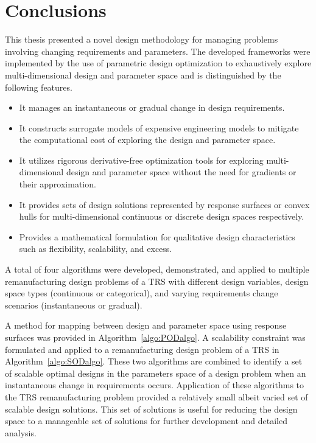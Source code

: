 \chapter{Conclusions}
\label{ch:conclusion}

This thesis presented a novel design methodology for managing problems involving changing requirements and parameters. The developed frameworks were implemented by the use of parametric design optimization to exhaustively explore multi-dimensional design and parameter space and is distinguished by the following features.

\begin{itemize}
    \item It manages an instantaneous or gradual change in design requirements.
    \item It constructs surrogate models of expensive engineering models to mitigate the computational cost of exploring the design and parameter space.
    \item It utilizes rigorous derivative-free optimization tools for exploring multi-dimensional design and parameter space without the need for gradients or their approximation.
    \item It provides sets of design solutions represented by response surfaces or convex hulls for multi-dimensional continuous or discrete design spaces respectively.
    \item Provides a mathematical formulation for qualitative design characteristics such as flexibility, scalability, and excess.
\end{itemize}

A total of four algorithms were developed, demonstrated, and applied to multiple remanufacturing design problems of a \ac{TRS} with different design variables, design space types (continuous or categorical), and varying requirements change scenarios (instantaneous or gradual). 

A method for mapping between design and parameter space using response surfaces was provided in Algorithm~\ref{algo:PODalgo}. A scalability constraint was formulated and applied to a remanufacturing design problem of a \ac{TRS} in Algorithm~\ref{algo:SODalgo}. These two algorithms are combined to identify a set of scalable optimal designs in the parameters space of a design problem when an instantaneous change in requirements occurs. Application of these algorithms to the \ac{TRS} remanufacturing problem provided a relatively small albeit varied set of scalable design solutions. This set of solutions is useful for reducing the design space to a manageable set of solutions for further development and detailed analysis.

